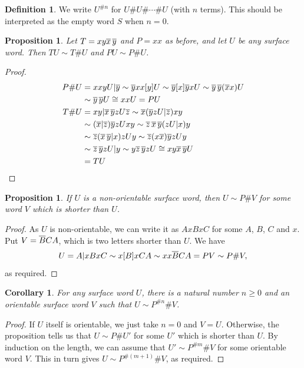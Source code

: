 \documentclass[reqno]{amsart}
\newtheorem{proposition}[theorem]{Proposition}
\newtheorem{corollary}[theorem]{Corollary}
\theoremstyle{definition}
\newtheorem{definition}[theorem]{Definition}
\begin{document}
\begin{definition}
 We write $U^{\# n}$ for $U\# U\#\dotsb\# U$ (with $n$ terms).  This
 should be interpreted as the empty word $S$ when $n=0$.
\end{definition}

\begin{proposition}\label{prop-collar}
 Let $T=xy\overline{x}\,\overline{y}$ and $P=xx$ as before, and let $U$ be any surface
 word.  Then $TU\sim T\#U$ and $PU\sim P\# U$.
\end{proposition}
\begin{proof}
 \begin{align*}
  P\# U &= xxyU|\overline{y} 
         \sim \overline{y} xx[y] U
         \sim \overline{y}[x]\overline{y} x U 
         \sim \overline{y}\,\overline{y}(\overline{x} x) U \\
        &\sim \overline{y}\,\overline{y} U 
         \cong xxU
         = PU \\
  T\# U &= xy|\overline{x}\,\overline{y} zU\overline{z} 
         \sim \overline{x}(\overline{y} zU|\overline{z}) xy \\
        &\sim (\overline{x}|\overline{z})\overline{y} zUxy 
         \sim \overline{z}\,\overline{x}\,\overline{y} (zU|x) y \\
        &\sim \overline{z}(\overline{x}\,\overline{y}|x)zU y
         \sim \overline{z}(x\overline{x})\overline{y} zUy \\
        &\sim \overline{z}\,\overline{y} z U|y 
         \sim y\overline{z}\,\overline{y} z U 
         \cong xy\overline{x}\,\overline{y} U \\
        &= TU \\
 \end{align*}
\end{proof}

\begin{proposition}\label{prop-extract-P}
 If $U$ is a non-orientable surface word, then $U\sim P\# V$ for some
 word $V$ which is shorter than $U$.
\end{proposition}
\begin{proof}
 As $U$ is non-orientable, we can write it as $AxBxC$ for some $A$,
 $B$, $C$ and $x$.  Put $V=\overline{B}CA$, which is two letters shorter
 than $U$.  We have 
 \[ U = A|xBxC \sim x[B]xCA \sim xx\overline{B}CA = PV\sim P\# V, \]
 as required.
\end{proof}

\begin{corollary}\label{cor-make-orientable}
 For any surface word $U$, there is a natural number $n\geq 0$ and an
 orientable surface word $V$ such that $U\sim P^{\# n}\# V$.  
\end{corollary}
\begin{proof}
 If $U$ itself is orientable, we just take $n=0$ and $V=U$.
 Otherwise, the proposition tells us that $U\sim P\# U'$ for some $U'$
 which is shorter than $U$.  By induction on the length, we can assume
 that $U'\sim P^{\# m}\# V$ for some orientable word $V$.  This in
 turn gives $U\sim P^{\#(m+1)}\# V$, as required.
\end{proof}
\end{document}
